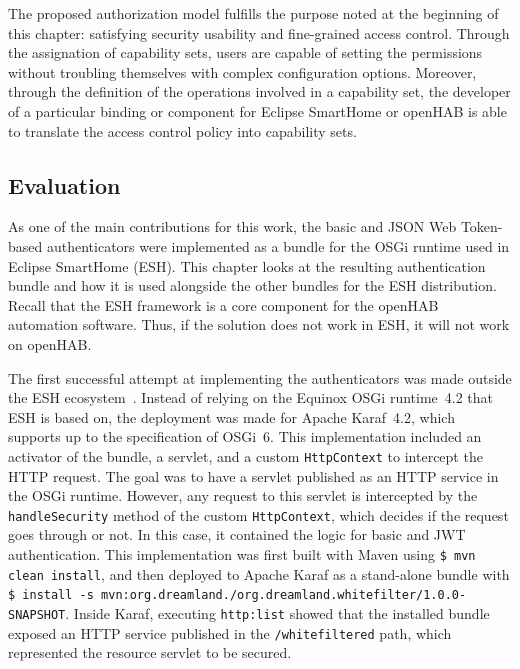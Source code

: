 \documentclass[12pt]{article}
\begin{document}
The proposed authorization model fulfills the purpose noted at the beginning of this chapter: satisfying security usability and fine-grained access control. Through the assignation of capability sets, users are capable of setting the permissions without troubling themselves with complex configuration options. Moreover, through the definition of the operations involved in a capability set, the developer of a particular binding or component for Eclipse SmartHome or openHAB is able to translate the access control policy into capability sets.

\subsection{Evaluation}
\label{sec:eval}

As one of the main contributions for this work, the basic and JSON Web Token-based authenticators were implemented as a bundle for the OSGi runtime used in Eclipse SmartHome (ESH). This chapter looks at the resulting authentication bundle and how it is used alongside the other bundles for the ESH distribution. Recall that the ESH framework is a core component for the openHAB automation software. Thus, if the solution does not work in ESH, it will not work on openHAB.

The first successful attempt at implementing the authenticators was made outside the ESH ecosystem~\cite{repo_02}. Instead of relying on the Equinox OSGi runtime~4.2 that ESH is based on, the deployment was made for Apache Karaf~4.2, which supports up to the specification of OSGi~6. This implementation included an activator of the bundle, a servlet, and a custom \texttt{HttpContext} to intercept the HTTP request. The goal was to have a servlet published as an HTTP service in the OSGi runtime. However, any request to this servlet is intercepted by the \texttt{handleSecurity} method of the custom \texttt{HttpContext}, which decides if the request goes through or not. In this case, it contained the logic for basic and JWT authentication. This implementation was first built with Maven using \texttt{\$ mvn clean install}, and then deployed to Apache Karaf as a stand-alone bundle with \texttt{\$ install -s mvn:org.dreamland./org.dreamland.whitefilter/1.0.0-SNAPSHOT}. Inside Karaf, executing \texttt{http:list} showed that the installed bundle exposed an HTTP service published in the \texttt{/whitefiltered} path, which represented the resource servlet to be secured.
\end{document}
